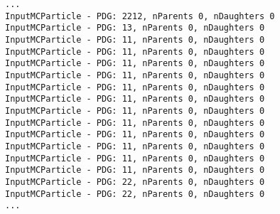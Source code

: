 \begin{lstlisting}[caption=Output of the programm]
...
InputMCParticle - PDG: 2212, nParents 0, nDaughters 0
InputMCParticle - PDG: 13, nParents 0, nDaughters 0
InputMCParticle - PDG: 11, nParents 0, nDaughters 0
InputMCParticle - PDG: 11, nParents 0, nDaughters 0
InputMCParticle - PDG: 11, nParents 0, nDaughters 0
InputMCParticle - PDG: 11, nParents 0, nDaughters 0
InputMCParticle - PDG: 11, nParents 0, nDaughters 0
InputMCParticle - PDG: 11, nParents 0, nDaughters 0
InputMCParticle - PDG: 11, nParents 0, nDaughters 0
InputMCParticle - PDG: 11, nParents 0, nDaughters 0
InputMCParticle - PDG: 11, nParents 0, nDaughters 0
InputMCParticle - PDG: 11, nParents 0, nDaughters 0
InputMCParticle - PDG: 11, nParents 0, nDaughters 0
InputMCParticle - PDG: 11, nParents 0, nDaughters 0
InputMCParticle - PDG: 22, nParents 0, nDaughters 0
InputMCParticle - PDG: 22, nParents 0, nDaughters 0
...
\end{lstlisting}

